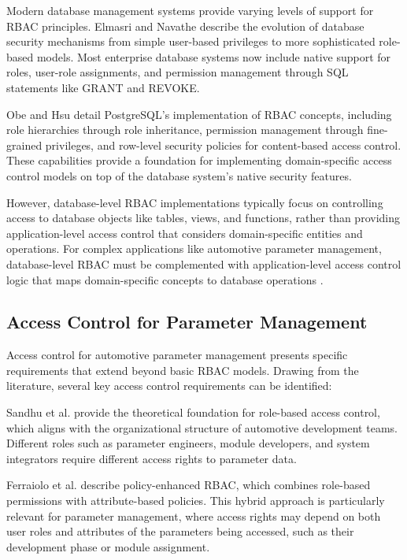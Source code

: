 Modern database management systems provide varying levels of support for \ac{RBAC} principles. Elmasri and Navathe \cite{elmasri2015fundamentals} describe the evolution of database security mechanisms from simple user-based privileges to more sophisticated role-based models. Most enterprise database systems now include native support for roles, user-role assignments, and permission management through \ac{SQL} statements like GRANT and REVOKE.

Obe and Hsu \cite{obe2017postgresql} detail PostgreSQL's implementation of \ac{RBAC} concepts, including role hierarchies through role inheritance, permission management through fine-grained privileges, and row-level security policies for content-based access control. These capabilities provide a foundation for implementing domain-specific access control models on top of the database system's native security features.

However, database-level \ac{RBAC} implementations typically focus on controlling access to database objects like tables, views, and functions, rather than providing application-level access control that considers domain-specific entities and operations. For complex applications like automotive parameter management, database-level \ac{RBAC} must be complemented with application-level access control logic that maps domain-specific concepts to database operations \cite{ferraiolo2011policy}.

\subsection{Access Control for Parameter Management}
\label{subsec:access-control-parameter-management}

Access control for automotive parameter management presents specific requirements that extend beyond basic \ac{RBAC} models. Drawing from the literature, several key access control requirements can be identified:

Sandhu et al. \cite{sandhu1998role} provide the theoretical foundation for role-based access control, which aligns with the organizational structure of automotive development teams. Different roles such as parameter engineers, module developers, and system integrators require different access rights to parameter data.

Ferraiolo et al. \cite{ferraiolo2011policy} describe policy-enhanced \ac{RBAC}, which combines role-based permissions with attribute-based policies. This hybrid approach is particularly relevant for parameter management, where access rights may depend on both user roles and attributes of the parameters being accessed, such as their development phase or module assignment.

